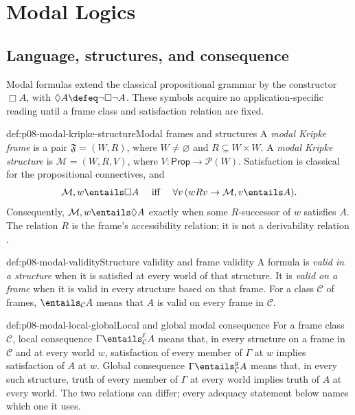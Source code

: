 \chapter{Modal Logics}\label{sec:p08-modal-logics}

\section{Language, structures, and consequence}

Modal formulas extend the classical propositional grammar by the constructor
\(\Box A\), with \(\Diamond A\defeq\neg\Box\neg A\).  These symbols acquire
no application-specific reading until a frame class and satisfaction relation
are fixed.

\begin{hbdefinition}{def:p08-modal-kripke-structure}{Modal frames and structures}
A \emph{modal Kripke frame} is a pair \(\mathfrak F=(W,R)\), where
\(W\ne\varnothing\) and \(R\subseteq W\times W\).  A \emph{modal Kripke
structure} is \(\mathcal M=(W,R,V)\), where
\(V:\mathsf{Prop}\to\mathcal P(W)\).  Satisfaction is classical for the
propositional connectives, and
\[
 \mathcal M,w\entails\Box A
 \quad\text{ iff }\quad
 \forall v\,(wRv\to\mathcal M,v\entails A).
\]
Consequently, \(\mathcal M,w\entails\Diamond A\) exactly when some
\(R\)-successor of \(w\) satisfies \(A\).  The relation \(R\) is the frame's
accessibility relation; it is not a derivability relation
\cite{Kripke1963}.
\end{hbdefinition}

\begin{hbdefinition}{def:p08-modal-validity}{Structure validity and frame validity}
A formula is \emph{valid in a structure} when it is satisfied at every world
of that structure.  It is \emph{valid on a frame} when it is valid in every
structure based on that frame.  For a class \(\mathcal C\) of frames,
\(\entails_{\mathcal C}A\) means that \(A\) is valid on every frame in
\(\mathcal C\).
\end{hbdefinition}

\begin{hbdefinition}{def:p08-modal-local-global}{Local and global modal consequence}
For a frame class \(\mathcal C\), local consequence
\(\Gamma\entails^{\ell}_{\mathcal C}A\) means that, in every structure on a
frame in \(\mathcal C\) and at every world \(w\), satisfaction of every member
of \(\Gamma\) at \(w\) implies satisfaction of \(A\) at \(w\).  Global
consequence \(\Gamma\entails^{g}_{\mathcal C}A\) means that, in every such
structure, truth of every member of \(\Gamma\) at every world implies truth of
\(A\) at every world.  The two relations can differ; every adequacy statement
below names which one it uses.
\end{hbdefinition}

